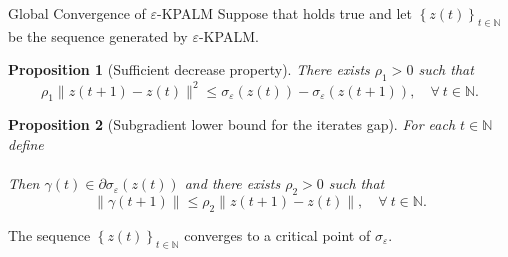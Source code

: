 \documentclass[9pt]{beamer}
\newtheorem{proposition}{Proposition}
\newcommand{\nn}{\mathbb{N}} %
\begin{document}
	\begin{frame}{Global Convergence of $\varepsilon$-KPALM}
		Suppose that  holds true and let $\left\lbrace z(t) \right\rbrace_{t \in \mathbb{N}}$ be the sequence generated by $\varepsilon$-KPALM.
		\begin{proposition}[Sufficient decrease property]
		There exists $\rho_1 > 0$ such that 
		\begin{equation*}
			\rho_1 \|z(t+1) - z(t)\|^2 \leq \sigma_{\varepsilon}(z(t)) - \sigma_{\varepsilon}(z(t+1)), \quad \forall \: t \in \mathbb{N} .
		\end{equation*}
		\end{proposition}
		\pause
		\begin{proposition}[Subgradient lower bound for the iterates gap]
		For each $t \in \nn$ define\\
		\\
		Then $\gamma(t) \in \partial \sigma_{\varepsilon}(z(t))$ and there exists $\rho_2 > 0$ such that 
		\begin{equation*}
			\| \gamma(t+1)\| \leq \rho_2 \|z(t+1) - z(t)\|, \quad \forall \: t \in \mathbb{N} .
		\end{equation*}
		\end{proposition}
		\pause
		\begin{theorem}
		The sequence $\left\lbrace z(t) \right\rbrace_{t \in \nn}$ converges to a critical point of $\sigma_{\varepsilon}$.
		\end{theorem}
	\end{frame}	
	
\end{document}
